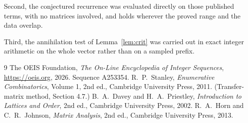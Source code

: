 \documentclass[11pt,a4paper]{article}
\theoremstyle{plain}
\theoremstyle{definition}
\begin{document}
Second, the conjectured recurrence was evaluated directly on those published terms, with no
matrices involved, and holds wherever the proved range and the data overlap.

Third, the annihilation test of Lemma~\ref{lem:crit} was carried out in exact integer
arithmetic on the whole vector rather than on a sampled prefix.

\begin{thebibliography}{9}
 The OEIS Foundation, \emph{The On-Line Encyclopedia of Integer
Sequences}, \url{https://oeis.org}, 2026. Sequence A253354.
 R.~P.~Stanley, \emph{Enumerative Combinatorics}, Volume 1, 2nd ed.,
Cambridge University Press, 2011. (Transfer-matrix method, Section 4.7.)
 B.~A.~Davey and H.~A.~Priestley, \emph{Introduction to Lattices and
Order}, 2nd ed., Cambridge University Press, 2002.
 R.~A.~Horn and C.~R.~Johnson, \emph{Matrix Analysis}, 2nd ed., Cambridge
University Press, 2013.
\end{thebibliography}
\end{document}
